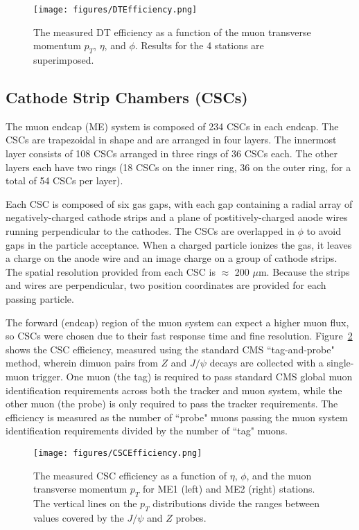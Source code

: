\begin{figure}\centering
  \texttt{[image: figures/DTEfficiency.png]}
  \caption{\label{fig:DTEfficiency} The measured DT efficiency as a function of the muon transverse momentum $p_T$,
$\eta$, and $\phi$. Results for the 4 stations are superimposed.}
\end{figure}

\subsection{Cathode Strip Chambers (CSCs)}

The muon endcap (ME) system is composed of 234 CSCs in each endcap. The CSCs are trapezoidal in shape and are arranged in four layers. The innermost layer consists of 108 CSCs arranged in three rings of 36 CSCs each. The other layers each have two rings (18 CSCs on the inner ring, 36 on the outer ring, for a total of 54 CSCs per layer).\cite{Muon}

Each CSC is composed of six gas gaps, with each gap containing a radial array of negatively-charged cathode strips and a plane of postitively-charged anode wires running perpendicular to the cathodes. The CSCs are overlapped in $\phi$ to avoid gaps in the particle acceptance. When a charged particle ionizes the gas, it leaves a charge on the anode wire and an image charge on a group of cathode strips. The spatial resolution provided from each CSC is $\approx$ 200 $\mu$m. Because the strips and wires are perpendicular, two position coordinates are provided for each passing particle.

The forward (endcap) region of the muon system can expect a higher muon flux, so CSCs were chosen due to their fast response time and fine resolution. Figure~\ref{fig:CSCEfficiency} shows the CSC efficiency, measured using the standard CMS ``tag-and-probe" method, wherein dimuon pairs from $Z$ and $J/\psi$ decays are collected with a single-muon trigger. One muon (the tag) is required to pass standard CMS global muon identification requirements across both the tracker and muon system, while the other muon (the probe) is only required to pass the tracker requirements. The efficiency is measured as the number of ``probe" muons passing the muon system identification requirements divided by the number of ``tag" muons.\cite{Muon}

\begin{figure}\centering
  \texttt{[image: figures/CSCEfficiency.png]}
  \caption{\label{fig:CSCEfficiency} The measured CSC efficiency as a function of $\eta$, $\phi$, and the muon transverse momentum $p_T$ for ME1 (left) and ME2 (right) stations. The vertical lines on the $p_T$ distributions divide the ranges between values covered by the $J/\psi$ and $Z$ probes.}
\end{figure}

